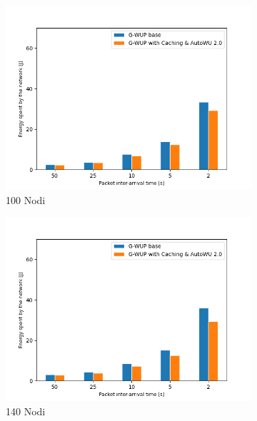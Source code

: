 \begin{figure}[h!]
  \begin{subfigure}[t]{0.329\linewidth}
    \includegraphics[width=1.13\linewidth]{Contents/Images/graphs/analisi_final2.0/energySpent/energySpent_100.png}
    \caption{100 Nodi}
  \end{subfigure}
  \begin{subfigure}[t]{0.329\linewidth}
    \includegraphics[width=1.13\linewidth]{Contents/Images/graphs/analisi_final2.0/energySpent/energySpent_140.png}
    \caption{140 Nodi}
  \end{subfigure}
  \begin{subfigure}[t]{0.329\linewidth}

\end{subfigure}
\end{figure}
